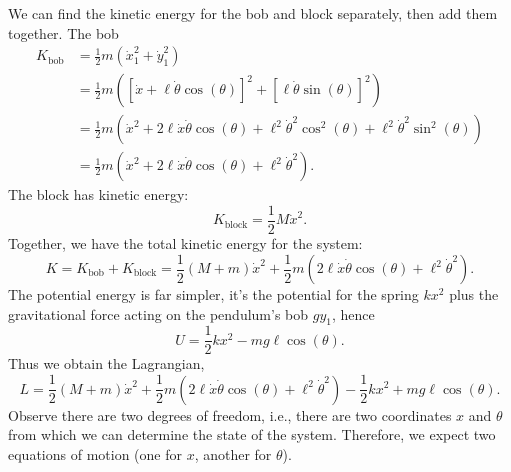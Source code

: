 \M
We can find the kinetic energy for the bob and block separately, then
add them together. The bob
\begin{subequations}
  \begin{align}
K_{\text{bob}} &= \frac{1}{2}m(\dot{x}_{1}^{2} + \dot{y}_{1}^{2})\\
&= \frac{1}{2}m([\dot{x} + \ell\dot\theta\cos(\theta)]^{2} + [\ell\dot\theta\sin(\theta)]^{2})\\
&= \frac{1}{2}m(\dot{x}^{2} + 2\ell\dot{x}\dot{\theta}\cos(\theta) + \ell^{2}\dot\theta^{2}\cos^{2}(\theta) + \ell^{2}\dot\theta^{2}\sin^{2}(\theta))\\
&= \frac{1}{2}m(\dot{x}^{2} + 2\ell\dot{x}\dot{\theta}\cos(\theta) + \ell^{2}\dot\theta^{2}).
  \end{align}
\end{subequations}
The block has kinetic energy:
\begin{equation}
K_{\text{block}} = \frac{1}{2}M\dot{x}^{2}.
\end{equation}
Together, we have the total kinetic energy for the system:
\begin{equation}
K = K_{\text{bob}} + K_{\text{block}} = \frac{1}{2}(M + m)\dot{x}^{2} + \frac{1}{2}m(2\ell\dot{x}\dot{\theta}\cos(\theta) + \ell^{2}\dot\theta^{2}).
\end{equation}
The potential energy is far simpler, it's the potential for the spring
$kx^{2}$ plus the gravitational force acting on the pendulum's bob
$gy_{1}$, hence
\begin{equation}
U = \frac{1}{2}kx^{2} - mg\ell\cos(\theta).
\end{equation}
Thus we obtain the Lagrangian,
\begin{equation}
L = \frac{1}{2}(M + m)\dot{x}^{2} + \frac{1}{2}m(2\ell\dot{x}\dot{\theta}\cos(\theta) + \ell^{2}\dot\theta^{2})
- \frac{1}{2}kx^{2} + mg\ell\cos(\theta).
\end{equation}
Observe there are two degrees of freedom, i.e., there are two
coordinates $x$ and $\theta$ from which we can determine the state of
the system. Therefore, we expect two equations of motion (one for $x$,
another for $\theta$).

